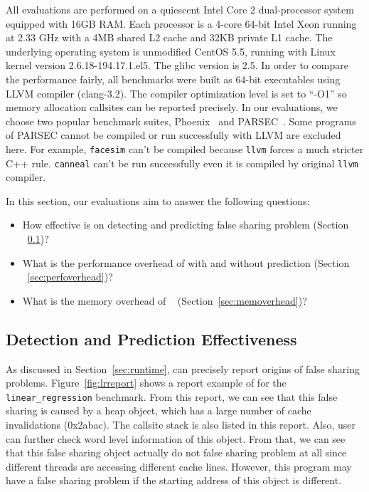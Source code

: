 \label{sec:evaluation}

All evaluations are performed on a quiescent Intel Core 2 dual-processor system equipped with 
16GB RAM. 
Each processor is a 4-core 64-bit Intel Xeon running at 2.33 GHz with a 4MB
shared L2 cache and 32KB private L1 cache. 
The underlying operating system is unmodified CentOS 5.5, running with Linux kernel
version 2.6.18-194.17.1.el5. The glibc version is 2.5. 
In order to compare the performance fairly, all benchmarks were built as 64-bit executables 
using LLVM compiler (clang-3.2). The compiler optimization level is set to ``-O1'' 
so memory allocation callsites can be reported precisely.
In our evaluations, 
we choose two popular benchmark suites, Phoenix~\cite{phoenix-hpca} 
and PARSEC~\cite{parsec}. 
Some programs of PARSEC cannot be compiled or run successfully with LLVM are excluded here.
For example, \texttt{facesim} can't be compiled 
because \texttt{llvm} forces a much stricter C++ rule. 
\texttt{canneal} can't be run successfully even it is compiled by original \texttt{llvm} compiler.

In this section, our evaluations aim to answer the following questions:
\begin{itemize}
\item
  How effective is \Predator{} on detecting and predicting false sharing problem (Section ~\ref{sec:effective})?

\item
  What is the performance overhead of \Predator{} with and without prediction
  (Section ~\ref{sec:perfoverhead})?

\item
  What is the memory overhead of \Predator{}~ (Section~\ref{sec:memoverhead})?
\end{itemize}


\subsection{Detection and Prediction Effectiveness}
\label{sec:effective}

As discussed in Section~\ref{sec:runtime}, \Predator{} can precisely report origins of 
false sharing problems. 
Figure~\ref{fig:lrreport} shows a report example of \Predator{} for the \texttt{linear\_regression} 
benchmark. From this report, we can see that this false sharing is caused by a heap object, which
has a large number of cache invalidations (0x2abac). 
The callsite stack is also listed in this report. Also, user can further check word level information
of this object. From that, we can see that this false sharing object actually do not false sharing
problem at all since different threads are accessing different cache lines. However, this program may
have a false sharing problem if the starting address of this object is different. 

